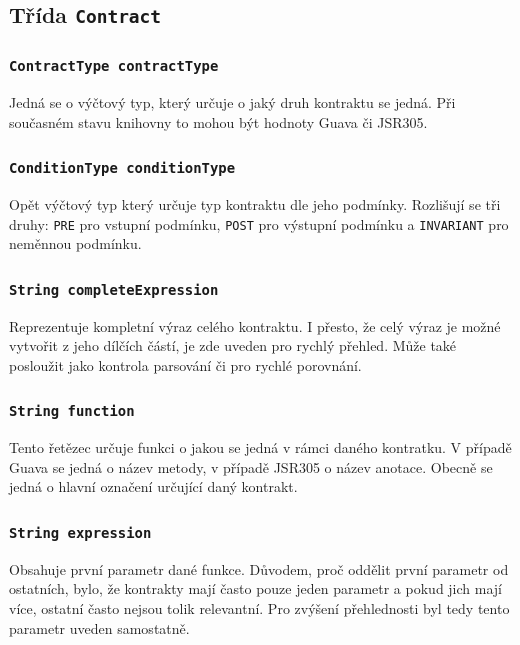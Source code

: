 			
			\subsection{Třída \texttt{Contract}}			
			
				\subsubsection{\texttt{ContractType contractType}} 
					Jedná se o výčtový typ, který určuje o jaký druh kontraktu se jedná. Při současném stavu knihovny to mohou být hodnoty Guava či JSR305.
			
				\subsubsection{\texttt{ConditionType conditionType}} 
					Opět výčtový typ který určuje typ kontraktu dle jeho podmínky. Rozlišují se tři druhy: \texttt{PRE} pro vstupní podmínku, \texttt{POST} pro výstupní podmínku a \texttt{INVARIANT} pro neměnnou podmínku.
			
				\subsubsection{\texttt{String completeExpression}} 
					Reprezentuje kompletní výraz celého kontraktu. I přesto, že celý výraz je možné vytvořit z jeho dílčích částí, je zde uveden pro rychlý přehled. Může také posloužit jako kontrola parsování či pro rychlé porovnání.
			
				\subsubsection{\texttt{String function}} 
					Tento řetězec určuje funkci o jakou se jedná v rámci daného kontratku. V případě Guava se jedná o název metody, v případě JSR305 o název anotace. Obecně se jedná o hlavní označení určující daný kontrakt.
			
				\subsubsection{\texttt{String expression}} 
					Obsahuje první parametr dané funkce. Důvodem, proč oddělit první parametr od ostatních, bylo, že kontrakty mají často pouze jeden parametr a pokud jich mají více, ostatní často nejsou tolik relevantní. Pro zvýšení přehlednosti byl tedy tento parametr uveden samostatně.
			
